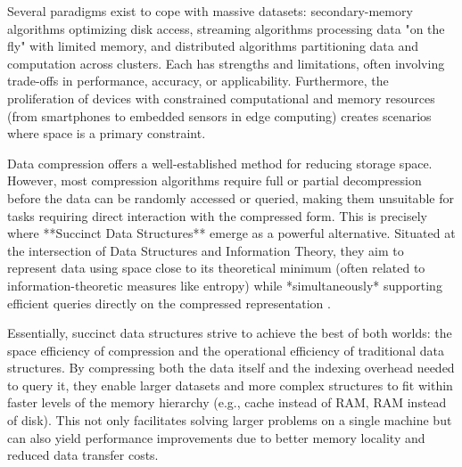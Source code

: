 Several paradigms exist to cope with massive datasets: secondary-memory algorithms optimizing disk access, streaming algorithms processing data "on the fly" with limited memory, and distributed algorithms partitioning data and computation across clusters. Each has strengths and limitations, often involving trade-offs in performance, accuracy, or applicability. Furthermore, the proliferation of devices with constrained computational and memory resources (from smartphones to embedded sensors in edge computing) creates scenarios where space is a primary constraint.

Data compression offers a well-established method for reducing storage space. However, most compression algorithms require full or partial decompression before the data can be randomly accessed or queried, making them unsuitable for tasks requiring direct interaction with the compressed form. This is precisely where **Succinct Data Structures** emerge as a powerful alternative. Situated at the intersection of Data Structures and Information Theory, they aim to represent data using space close to its theoretical minimum (often related to information-theoretic measures like entropy) while *simultaneously* supporting efficient queries directly on the compressed representation \cite{navarro2016compact}.

Essentially, succinct data structures strive to achieve the best of both worlds: the space efficiency of compression and the operational efficiency of traditional data structures. By compressing both the data itself and the indexing overhead needed to query it, they enable larger datasets and more complex structures to fit within faster levels of the memory hierarchy (e.g., cache instead of RAM, RAM instead of disk). This not only facilitates solving larger problems on a single machine but can also yield performance improvements due to better memory locality and reduced data transfer costs.


